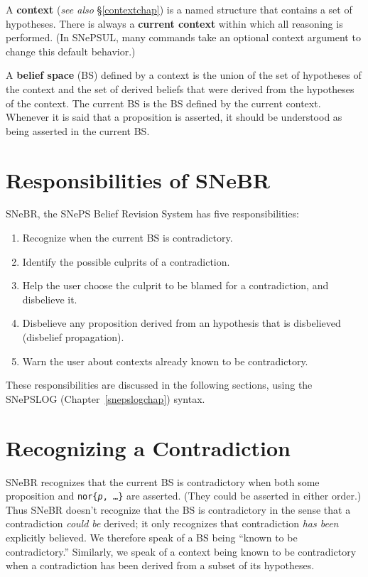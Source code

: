 \documentclass{book}
\newcommand{\cv}[1]{{\ttfamily{\itshape #1}}} %
\begin{document}
A \textbf{context} (\textit{see also}
\S\ref{contextchap}) is a named structure that contains a set of
hypotheses.  There is always a \textbf{current context} within which all reasoning is performed.  (In SNePSUL, many
commands take an optional context argument to change this default
behavior.)

A \textbf{belief space} (BS) defined by a context
is the union of the set of hypotheses of the context and the set of
derived beliefs that were derived from the hypotheses of the context.
The current BS is the BS defined by the current context.  Whenever it
is said that a proposition is asserted, it should be understood as
being asserted in the current BS.


\section{Responsibilities of SNeBR}
SNeBR, the SNePS Belief Revision System has five responsibilities:
\begin{enumerate}
\item Recognize when the current BS is contradictory.
\item Identify the possible culprits of a contradiction.
\item Help the user choose the culprit to be blamed for a
  contradiction, and disbelieve it.
\item Disbelieve any proposition derived from an hypothesis that is
  disbelieved (disbelief propagation).
\item Warn the user about contexts already known to be contradictory.
\end{enumerate}
These responsibilities are discussed in the following sections, using
the SNePSLOG (Chapter~\ref{snepslogchap}) syntax.

\section{Recognizing a Contradiction}
SNeBR recognizes that the current BS is contradictory when both some proposition
\cv{p} and \texttt{nor\{\textit{p}, \ldots\}} are asserted. (They could be
asserted in either order.)  Thus SNeBR doesn't recognize that the BS is
contradictory in the sense that a contradiction \textit{could be} derived; it
only recognizes that contradiction \textit{has been} explicitly believed.  We
therefore speak of a BS being ``known to be contradictory.''  Similarly, we
speak of a context being known to be contradictory when a contradiction has been
derived from a subset of its hypotheses.
\end{document}
